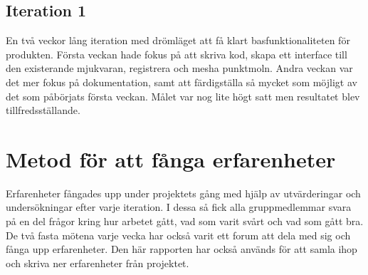 \subsection{Iteration 1}

En två veckor lång iteration med drömläget att få klart basfunktionaliteten för produkten. Första veckan hade fokus på att skriva kod, skapa ett interface till den existerande mjukvaran, registrera och mesha punktmoln. Andra veckan var det mer fokus på dokumentation, samt att färdigställa så mycket som möjligt av det som påbörjats första veckan. Målet var nog lite högt satt men resultatet blev tillfredsställande.

\section{Metod för att fånga erfarenheter}

Erfarenheter fångades upp under projektets gång med hjälp av utvärderingar och undersökningar efter varje iteration. I dessa så fick alla gruppmedlemmar svara på en del frågor kring hur arbetet gått, vad som varit svårt och vad som gått bra. De två fasta mötena varje vecka har också varit ett forum att dela med sig och fånga upp erfarenheter. Den här rapporten har också används för att samla ihop och skriva ner erfarenheter från projektet. 



